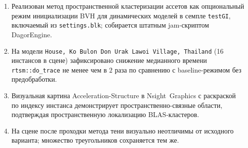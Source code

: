 \begin{enumerate}
    \item Реализован метод пространственной кластеризации ассетов как
      опциональный режим инициализации BVH для динамических
      моделей в семпле \texttt{testGI}, включаемый из
      \texttt{settings.blk}; собирается штатным
      jam-скриптом DagorEngine.
    \item На модели \texttt{House, Ko Bulon Don Urak Lawoi Village, Thailand} (16 инстансов в сцене)
      зафиксировано снижение медианного времени
      \texttt{rtsm::do\_trace} не менее чем в $2$ раза по
      сравнению с baseline-режимом без предобработки.
    \item Визуальная картина Acceleration-Structure в
      Nsight~Graphics с раскраской по индексу инстанса
      демонстрирует пространственно-связные области, подтверждая
      пространственную локализацию BLAS-кластеров.
    \item На сцене после проходки метода тени визуально неотличимы от исходного варианта; множество треугольников сохраняется тем же.
\end{enumerate}
